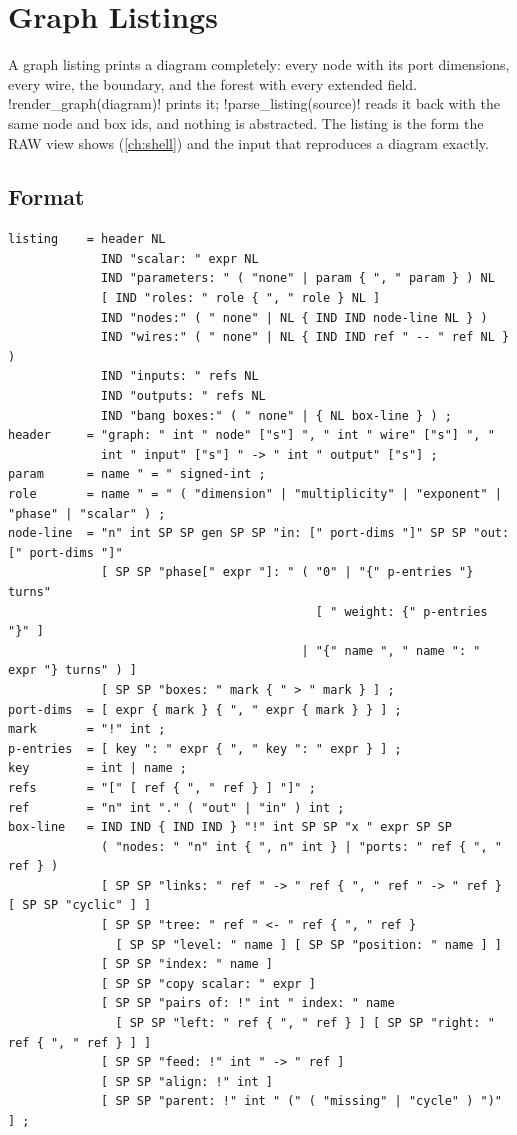 \section{Graph Listings}\label{sec:language-listing}

A graph listing prints a diagram completely: every node with its port dimensions, every wire, the boundary, and the \bbox{} forest with every extended field. \py!render_graph(diagram)! prints it; \py!parse_listing(source)! reads it back with the same node and box ids, and nothing is abstracted. The listing is the form the RAW view shows (\cref{ch:shell}) and the input that reproduces a diagram exactly.

\subsection{Format}

\begin{lstlisting}[style=grammar,caption={Graph listing format. \texttt{SP} is one space; \texttt{IND} two spaces.},label={lst:language-listing}]
listing    = header NL
             IND "scalar: " expr NL
             IND "parameters: " ( "none" | param { ", " param } ) NL
             [ IND "roles: " role { ", " role } NL ]
             IND "nodes:" ( " none" | NL { IND IND node-line NL } )
             IND "wires:" ( " none" | NL { IND IND ref " -- " ref NL } )
             IND "inputs: " refs NL
             IND "outputs: " refs NL
             IND "bang boxes:" ( " none" | { NL box-line } ) ;
header     = "graph: " int " node" ["s"] ", " int " wire" ["s"] ", "
             int " input" ["s"] " -> " int " output" ["s"] ;
param      = name " = " signed-int ;
role       = name " = " ( "dimension" | "multiplicity" | "exponent" | "phase" | "scalar" ) ;
node-line  = "n" int SP SP gen SP SP "in: [" port-dims "]" SP SP "out: [" port-dims "]"
             [ SP SP "phase[" expr "]: " ( "0" | "{" p-entries "} turns"
                                           [ " weight: {" p-entries "}" ]
                                         | "{" name ", " name ": " expr "} turns" ) ]
             [ SP SP "boxes: " mark { " > " mark } ] ;
port-dims  = [ expr { mark } { ", " expr { mark } } ] ;
mark       = "!" int ;
p-entries  = [ key ": " expr { ", " key ": " expr } ] ;
key        = int | name ;
refs       = "[" [ ref { ", " ref } ] "]" ;
ref        = "n" int "." ( "out" | "in" ) int ;
box-line   = IND IND { IND IND } "!" int SP SP "x " expr SP SP
             ( "nodes: " "n" int { ", n" int } | "ports: " ref { ", " ref } )
             [ SP SP "links: " ref " -> " ref { ", " ref " -> " ref } [ SP SP "cyclic" ] ]
             [ SP SP "tree: " ref " <- " ref { ", " ref }
               [ SP SP "level: " name ] [ SP SP "position: " name ] ]
             [ SP SP "index: " name ]
             [ SP SP "copy scalar: " expr ]
             [ SP SP "pairs of: !" int " index: " name
               [ SP SP "left: " ref { ", " ref } ] [ SP SP "right: " ref { ", " ref } ] ]
             [ SP SP "feed: !" int " -> " ref ]
             [ SP SP "align: !" int ]
             [ SP SP "parent: !" int " (" ( "missing" | "cycle" ) ")" ] ;
\end{lstlisting}

